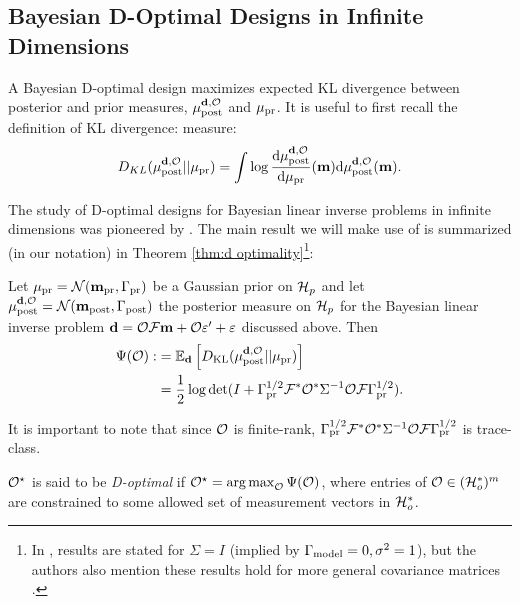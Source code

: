 \subsection{Bayesian D-Optimal Designs in Infinite Dimensions}\label{subsec:D optimal design} 
A Bayesian D-optimal design maximizes expected KL divergence between
posterior and prior measures, $\mu_{\textup{post}}^{\mathbf{d}, \mathcal{O}}$ and $\mu_{\textup{pr}}$. It is useful to first
recall the definition of KL divergence:%
measure:
$$
D_{KL}(\mu_{\textup{post}}^{\mathbf{d}, \mathcal{O}}||\mu_{\textup{pr}}) = \int \log \frac{\text{\textup{d}} \mu_{\textup{post}}^{\mathbf{d}, \mathcal{O}}}{\text{\textup{d}} \mu_{\textup{pr}}}(\mathbf{m}) \text{\textup{d}} \mu_{\textup{post}}^{\mathbf{d}, \mathcal{O}}(\mathbf{m}).
$$

The study of D-optimal designs for Bayesian linear inverse problems in
infinite dimensions was pioneered by \cite{AlexanderianGloorGhattas14,
  alexanderian2018efficient}. The main result we will make use of is
summarized (in our notation) in Theorem \ref{thm:d optimality}\footnote{In
\cite{AlexanderianGloorGhattas14, alexanderian2018efficient}, results
are stated for $\Sigma=I$ (implied by $\Gamma_{\textup{model}} = 0,\sigma^2=1$), but
the authors also mention these results hold for more general
covariance matrices \cite[p. 681]{AlexanderianGloorGhattas14}.}:


\begin{theorem}\label{thm:d optimality}
  Let $\mu_{\textup{pr}} = \mathcal{N}(\mathbf{m}_{\textup{pr}},\Gamma_{\textup{pr}})$ be a Gaussian prior on $\mathcal{H}_p$
  and let $\mu_{\textup{post}}^{\mathbf{d}, \mathcal{O}} = \mathcal{N}(\mathbf{m}_{\textup{post}},\Gamma_{\textup{post}})$ the posterior measure
  on $\mathcal{H}_p$ for the Bayesian linear inverse problem $\mathbf{d} = \mathcal{O}
  \mathcal{F}\mathbf{m} + \mathcal{O} \varepsilon' + \varepsilon$ discussed above. Then
  \begin{align}\label{eq:objective}
    \begin{split}
      \tar( \obs) :&= \mathbb{E}_{\data}\left [ D_{\text{KL}} (\post || \pr ) \right ] \\
      &= \frac12 \log \det 
      ( I + \prcov^{1/2}  \fwd ^* \obs^* \Sigma^{-1} \obs \fwd \prcov^{1/2}).
    \end{split}
  \end{align}
\end{theorem}
It is important to note that since $\mathcal{O}$ is finite-rank,
$\Gamma_{\textup{pr}}^{1/2} \mathcal{F} ^* \mathcal{O}^* \Sigma^{-1} \mathcal{O} \mathcal{F} \Gamma_{\textup{pr}}^{1/2}$ is
trace-class.
\begin{definition}\label{def:d optimality}
  $\mathcal{O}^{\star}$ is said to be \emph{D-optimal} if $\mathcal{O}^{\star} =
  \operatorname*{arg\,max}_{\mathcal{O}} \Psi(\mathcal{O})$, where entries of $\mathcal{O} \in (\mathcal{H}_o^*)^m$ are constrained to
  some allowed set of measurement vectors in $\mathcal{H}_o^*$.
\end{definition}

